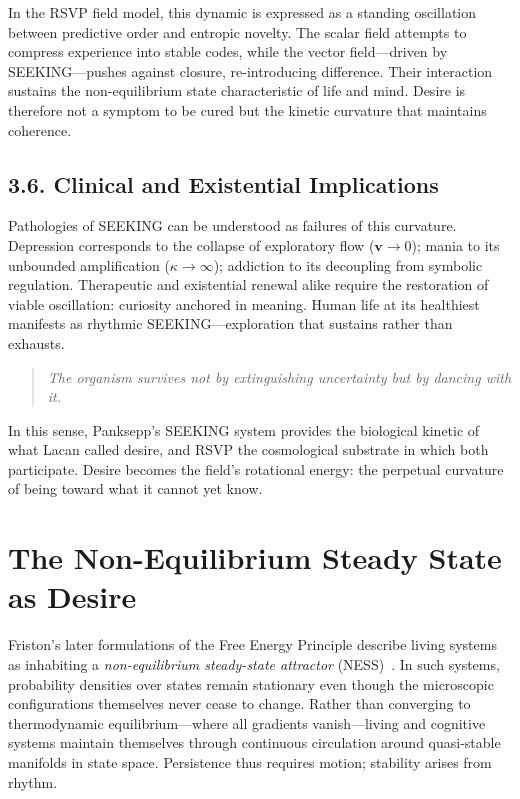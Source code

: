 \documentclass[12pt,a4paper]{article}
\begin{document}
In the RSVP field model, this dynamic is expressed as a standing oscillation between predictive order and entropic novelty.  
The scalar field attempts to compress experience into stable codes, while the vector field—driven by SEEKING—pushes against closure, re-introducing difference.  
Their interaction sustains the non-equilibrium state characteristic of life and mind.  
Desire is therefore not a symptom to be cured but the kinetic curvature that maintains coherence.

\subsection{3.6. Clinical and Existential Implications}

Pathologies of SEEKING can be understood as failures of this curvature.  
Depression corresponds to the collapse of exploratory flow (\(\mathbf{v} \to 0\)); mania to its unbounded amplification (\(\kappa \to \infty\)); addiction to its decoupling from symbolic regulation.  
Therapeutic and existential renewal alike require the restoration of viable oscillation: curiosity anchored in meaning.  
Human life at its healthiest manifests as rhythmic SEEKING—exploration that sustains rather than exhausts.

\begin{quote}
\textit{The organism survives not by extinguishing uncertainty but by dancing with it.}
\end{quote}

In this sense, Panksepp’s SEEKING system provides the biological kinetic of what Lacan called desire, and RSVP the cosmological substrate in which both participate.  
Desire becomes the field’s rotational energy: the perpetual curvature of being toward what it cannot yet know.

\section{The Non-Equilibrium Steady State as Desire}

Friston’s later formulations of the Free Energy Principle describe living systems as inhabiting a \emph{non-equilibrium steady-state attractor} (NESS)~\citep{friston2023noneq}.  
In such systems, probability densities over states remain stationary even though the microscopic configurations themselves never cease to change.  
Rather than converging to thermodynamic equilibrium—where all gradients vanish—living and cognitive systems maintain themselves through continuous circulation around quasi-stable manifolds in state space.  
Persistence thus requires motion; stability arises from rhythm.
\end{document}
